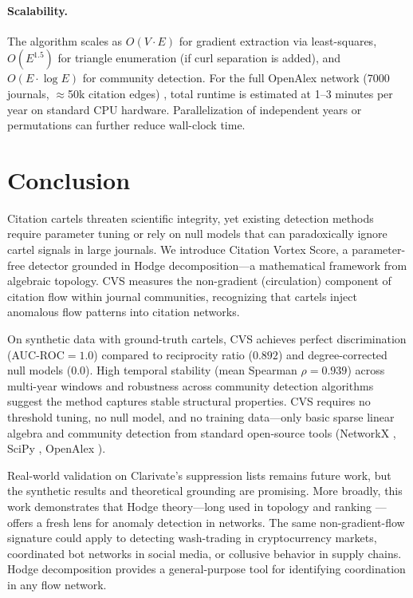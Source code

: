 \documentclass[11pt,letterpaper]{article}
\begin{document}
\paragraph{Scalability.}
The algorithm scales as $O(V \cdot E)$ for gradient extraction via least-squares, $O(E^{1.5})$ for triangle enumeration (if curl separation is added), and $O(E \cdot \log E)$ for community detection. For the full OpenAlex network (7000 journals, $\approx$50k citation edges) \citep{Priem2022}, total runtime is estimated at 1--3 minutes per year on standard CPU hardware. Parallelization of independent years or permutations can further reduce wall-clock time.

\section{Conclusion}

Citation cartels threaten scientific integrity, yet existing detection methods require parameter tuning or rely on null models that can paradoxically ignore cartel signals in large journals. We introduce Citation Vortex Score, a parameter-free detector grounded in Hodge decomposition---a mathematical framework from algebraic topology. CVS measures the non-gradient (circulation) component of citation flow within journal communities, recognizing that cartels inject anomalous flow patterns into citation networks.

On synthetic data with ground-truth cartels, CVS achieves perfect discrimination (AUC-ROC$=1.0$) compared to reciprocity ratio ($0.892$) and degree-corrected null models ($0.0$). High temporal stability (mean Spearman $\rho=0.939$) across multi-year windows and robustness across community detection algorithms suggest the method captures stable structural properties. CVS requires no threshold tuning, no null model, and no training data---only basic sparse linear algebra and community detection from standard open-source tools (NetworkX \citep{NetworkX2024}, SciPy \citep{SciPy2024}, OpenAlex \citep{Priem2022}).

Real-world validation on Clarivate's suppression lists remains future work, but the synthetic results and theoretical grounding are promising. More broadly, this work demonstrates that Hodge theory---long used in topology and ranking \citep{Jiang2011, Lim2024}---offers a fresh lens for anomaly detection in networks. The same non-gradient-flow signature could apply to detecting wash-trading in cryptocurrency markets, coordinated bot networks in social media, or collusive behavior in supply chains. Hodge decomposition provides a general-purpose tool for identifying coordination in any flow network.



\end{document}
